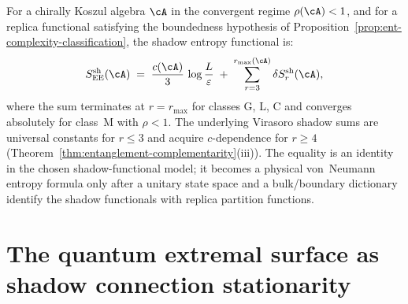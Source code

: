 \begin{corollary}
\label{cor:ent-full-entropy}
For a chirally Koszul algebra $\cA$ in the convergent
regime $\rho(\cA) < 1$, and for a replica functional satisfying
the boundedness hypothesis of
Proposition~\textup{\ref{prop:ent-complexity-classification}},
the shadow entropy functional is:
\begin{equation}\label{eq:ent-full}
S_{\EE}^{\mathrm{sh}}(\cA)
\;=\;
\frac{c(\cA)}{3}\,\log\frac{L}{\varepsilon}
\;+\;
\sum_{r=3}^{r_{\max}(\cA)}
\delta S_r^{\mathrm{sh}}(\cA),
\end{equation}
where the sum terminates at $r = r_{\max}$ for classes
G, L, C and converges absolutely for class~M
with $\rho < 1$. The underlying Virasoro shadow sums are universal
constants for $r \le 3$ and acquire $c$-dependence for $r \ge 4$
\textup{(}Theorem~\textup{\ref{thm:entanglement-complementarity}(iii)}\textup{)}.
The equality is an identity in the chosen shadow-functional model; it
becomes a physical von~Neumann entropy formula only after a unitary
state space and a bulk/boundary dictionary identify the shadow
functionals with replica partition functions.
\end{corollary}

%
%

\section{The quantum extremal surface as shadow
connection stationarity}
\label{sec:ent-qes}

